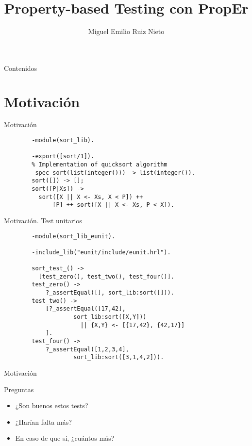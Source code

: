 \documentclass{beamer}
\title[ACFI]{Property-based Testing con PropEr}
\author[M. Ruiz (UCM)]{Miguel Emilio Ruiz Nieto}
\date{\mydate}
\begin{document}
  \begin{frame}
    \titlepage
  \end{frame}

  \begin{frame}{Contenidos}
    \tableofcontents[hideallsubsections]
  \end{frame}

  \section{Motivación}
    \begin{frame}[fragile]{Motivación}
      \begin{verbatim}
        -module(sort_lib).

        -export([sort/1]).
        % Implementation of quicksort algorithm
        -spec sort(list(integer())) -> list(integer()).
        sort([]) -> [];
        sort([P|Xs]) ->
          sort([X || X <- Xs, X < P]) ++
              [P] ++ sort([X || X <- Xs, P < X]).
      \end{verbatim}
    \end{frame}

    \begin{frame}[fragile]{Motivación. Test unitarios}
      \begin{verbatim}
        -module(sort_lib_eunit).

        -include_lib("eunit/include/eunit.hrl").

        sort_test_() ->
          [test_zero(), test_two(), test_four()].
        test_zero() ->
            ?_assertEqual([], sort_lib:sort([])).
        test_two() ->
            [?_assertEqual([17,42],
                    sort_lib:sort([X,Y]))
                      || {X,Y} <- [{17,42}, {42,17}]
            ].
        test_four() ->
            ?_assertEqual([1,2,3,4],
                    sort_lib:sort([3,1,4,2])).
      \end{verbatim}
    \end{frame}

    \begin{frame}{Motivación}
      \begin{block}{Preguntas}
        \begin{itemize}
          \item ¿Son buenos estos tests?
          \item ¿Harían falta más?
          \item En caso de que sí, ¿cuántos más?
        \end{itemize}
      \end{block}
    \end{frame}
\end{document}

